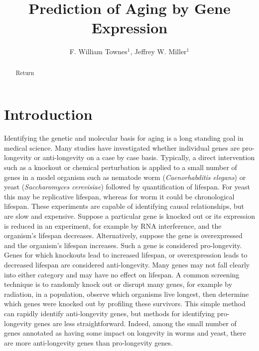 \documentclass{article}
\begin{document}
\title{Prediction of Aging by Gene Expression}

\author{F. William Townes$^{1}$, Jeffrey W. Miller$^{1}$}%
\affil{\footnotesize $^{1}$Department of Biostatistics, Harvard T.H. Chan School of Public Health, Boston, MA \\%
\normalsize {ftownes@g.harvard.edu, jwmiller@hsph.harvard.edu}
}
\maketitle

\newpage
\begin{abstract}
Return
\end{abstract}

\section{Introduction}
Identifying the genetic and molecular basis for aging is a long standing goal in medical science. Many studies have investigated whether individual genes are pro-longevity or anti-longevity on a case by case basis. Typically, a direct intervention such as a knockout or chemical perturbation is applied to a small number of genes in a model organism such as nematode worm (\textit{Caenorhabditis elegans}) or yeast (\textit{Saccharomyces cerevisiae}) followed by quantification of lifespan. For yeast this may be replicative lifespan, whereas for worm it could be chronological lifespan. These experiments are capable of identifying causal relationships, but are slow and expensive. Suppose a particular gene is knocked out or its expression is reduced in an experiment, for example by RNA interference, and the organism's lifespan decreases. Alternatively, suppose the gene is overexpressed and the organism's lifespan increases. Such a gene is considered pro-longevity. Genes for which knockouts lead to increased lifespan, or overexpression leads to decreased lifespan are considered anti-longevity. Many genes may not fall clearly into either category and may have no effect on lifespan. A common screening technique is to randomly knock out or disrupt many genes, for example by radiation, in a population, observe which organisms live longest, then determine which genes were knocked out by profiling these survivors. This simple method can rapidly identify anti-longevity genes, but methods for identifying pro-longevity genes are less straightforward. Indeed, among the small number of genes annotated as having some impact on longevity in worms and yeast, there are more anti-longevity genes than pro-longevity genes.
\end{document}
